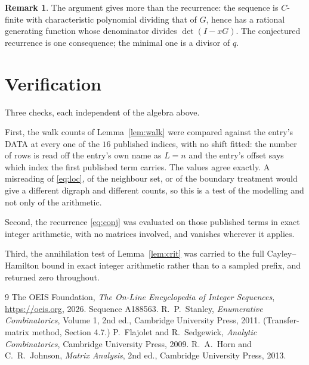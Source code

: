 \documentclass[11pt,a4paper]{article}
\theoremstyle{plain}
\theoremstyle{definition}
\newtheorem{remark}[theorem]{Remark}
\begin{document}
\begin{remark}
The argument gives more than the recurrence: the sequence is $C$-finite with characteristic
polynomial dividing that of $G$, hence has a rational generating function whose denominator
divides $\det(I-xG)$. The conjectured recurrence is one consequence; the minimal one is a
divisor of $q$.
\end{remark}

\section{Verification}

Three checks, each independent of the algebra above.

First, the walk counts of Lemma~\ref{lem:walk} were compared against the entry's DATA at
every one of the $16$ published indices, with no shift fitted: the number of rows is
read off the entry's own name as $L=n$ and the entry's offset says which index the first
published term carries. The values agree exactly. A misreading of \eqref{eq:loc}, of the
neighbour set, or of the boundary treatment would give a different digraph and different
counts, so this is a test of the modelling and not only of the arithmetic.

Second, the recurrence \eqref{eq:conj} was evaluated on those published terms in exact
integer arithmetic, with no matrices involved, and vanishes wherever it applies.

Third, the annihilation test of Lemma~\ref{lem:crit} was carried to the full
Cayley--Hamilton bound in exact integer arithmetic rather than to a sampled prefix, and
returned zero throughout.

\begin{thebibliography}{9}
 The OEIS Foundation, \emph{The On-Line Encyclopedia of Integer
Sequences}, \url{https://oeis.org}, 2026. Sequence A188563.
 R.~P.~Stanley, \emph{Enumerative Combinatorics}, Volume 1, 2nd ed.,
Cambridge University Press, 2011. (Transfer-matrix method, Section 4.7.)
 P.~Flajolet and R.~Sedgewick, \emph{Analytic Combinatorics}, Cambridge
University Press, 2009.
 R.~A.~Horn and C.~R.~Johnson, \emph{Matrix Analysis}, 2nd ed., Cambridge
University Press, 2013.
\end{thebibliography}
\end{document}
